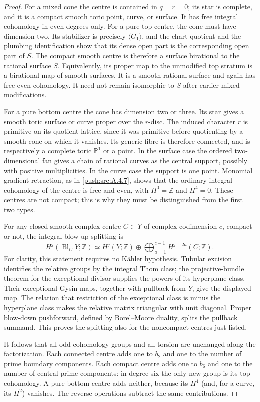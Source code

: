 \begin{proof}
For a mixed cone the centre is contained in $q=r=0$;
its star is complete, and it is a compact smooth toric
point, curve, or surface. It has free integral
cohomology in even degrees only. For a pure top centre,
the cone must have dimension two. Its stabilizer is
precisely $\langle G_1\rangle$, and the chart quotient
and the plumbing identification show that its dense
open part is the corresponding open part of $S$.
The compact smooth centre is therefore a surface
birational to the rational surface $S$. Equivalently,
its proper map to the unmodified top stratum is a
birational map of smooth surfaces. It is a smooth
rational surface and again has free even cohomology.
It need not remain isomorphic to $S$ after earlier
mixed modifications.

For a pure bottom centre the cone has dimension two
or three. Its star gives a smooth toric surface or
curve proper over the $r$-disc. The induced character
$r$ is primitive on its quotient lattice, since it
was primitive before quotienting by a smooth cone
on which it vanishes. Its generic fibre is therefore
connected, and is respectively a complete toric
$\mathbb P^1$ or a point. In the surface case the
ordered two-dimensional fan gives a chain of rational
curves as the central support, possibly with positive
multiplicities. In the curve case the support is one
point. Monomial gradient retraction, as in \ref{push:src:A.4.7},
shows that the ordinary integral cohomology of the
centre is free and even, with $H^0=\mathbb Z$ and
$H^4=0$. These centres are not compact; this is why
they must be distinguished from the first two types.

For any closed smooth complex centre $C\subset Y$ of
complex codimension $c$, compact or not, the integral
blow-up splitting is
\[
 H^j(\operatorname{Bl}_C Y;\mathbb Z)
 \simeq H^j(Y;\mathbb Z)\oplus
       \bigoplus_{a=1}^{c-1}H^{j-2a}(C;\mathbb Z).
\]
For clarity, this statement requires no K\"ahler
hypothesis. Tubular excision identifies the relative
groups by the integral Thom class; the projective-bundle
theorem for the exceptional divisor supplies the powers
of its hyperplane class. Their exceptional Gysin maps,
together with pullback from $Y$, give the displayed
map. The relation that restriction of the exceptional
class is minus the hyperplane class makes the relative
matrix triangular with unit diagonal. Proper
blow-down pushforward, defined by Borel--Moore duality,
splits the pullback summand. This proves the splitting
also for the noncompact centres just listed.

It follows that all odd cohomology groups and all
torsion are unchanged along the factorization. Each
connected centre adds one to $b_2$ and one to the number
of prime boundary components. Each compact centre
adds one to $b_6$ and one to the number of central
prime components: in degree six the only new group
is its top cohomology. A pure bottom centre adds
neither, because its $H^4$ (and, for a curve, its
$H^2$) vanishes. The reverse operations subtract
the same contributions.


\end{proof}

